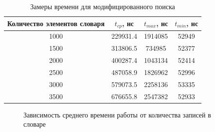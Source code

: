 \documentclass[12pt]{report}
\begin{document}
\begin{table}[h]
	\begin{center}
		\caption{\label{time3} Замеры времени для модифицированного поиска}
		\begin{tabular}{|c | c | c | c|} 
 			\hline
			Количество элементов словаря & $t_{cp}$, нс & $t_{max}$, нс & $t_{min}$, нс\\ [0.5ex] 
 			\hline\hline
 			1000 & 229931.4 & 1914085 & 52949\\
 			\hline
 			1500 & 313806.5 & 734985 & 52377\\
 			\hline
 			2000 & 400287.4 & 1043134 & 52414\\
 			\hline
 			2500 & 487058.9 & 1826962 & 52996\\
 			\hline
 			3000 & 579073.5 & 2258136 & 53335\\
 			\hline
 			3500 & 676655.8 & 2547382 & 52933\\
 			\hline
			\end{tabular}
	\end{center}
\end{table}

\begin{figure}[h]
\begin{center}
	\captionsetup{justification=centering}
	\caption{Зависимость среднего времени работы от количества записей в словаре}
	\label{timeRes1}
	\end{center}
\end{figure}
\end{document}
